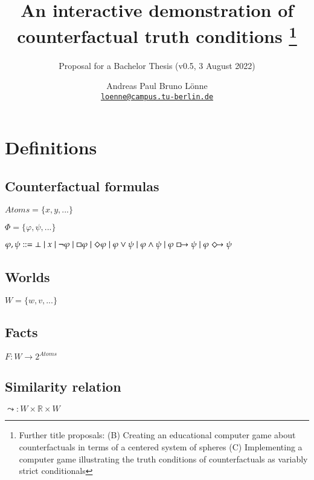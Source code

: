 \documentclass[a4paper,american]{paper}
\theoremstyle{definition}\newtheorem{definition}{Definition}
\providecommand*{\code}[1]{\texttt{#1}}
\begin{document}
\title{An interactive demonstration of counterfactual truth conditions%
	\footnote{Further title proposals:
		(B) Creating an educational computer game about counterfactuals in terms of a centered system of spheres
		(C) Implementing a computer game illustrating the truth conditions of counterfactuals as variably strict conditionals
	}
}

\subtitle{Proposal for a Bachelor Thesis (v0.5, 3 August 2022)}

\author{%
	Andreas Paul Bruno Lönne\\
	\code{\href{mailto:loenne@campus.tu-berlin.de}{loenne@campus.tu-berlin.de}}
}


\maketitle

\section*{Definitions}
\subsection{Counterfactual formulas}
$Atoms = \{x,y,...\}$

$\Phi = \{\varphi, \psi,... \}$

$\varphi, \psi ::= \bot \mid x \mid \neg \varphi \mid \Box \varphi \mid \Diamond \varphi \mid \varphi \vee \psi \mid \varphi \wedge \psi \mid \varphi \boxright \psi \mid \varphi \Diamondright \psi$

\subsection{Worlds}
$W = \{w,v,...\}$

\subsection{Facts}
$F \colon W \rightarrow 2^{Atoms}$

\subsection{Similarity relation}
$\leadsto \colon W\times \mathbb{R} \times W$
\end{document}
